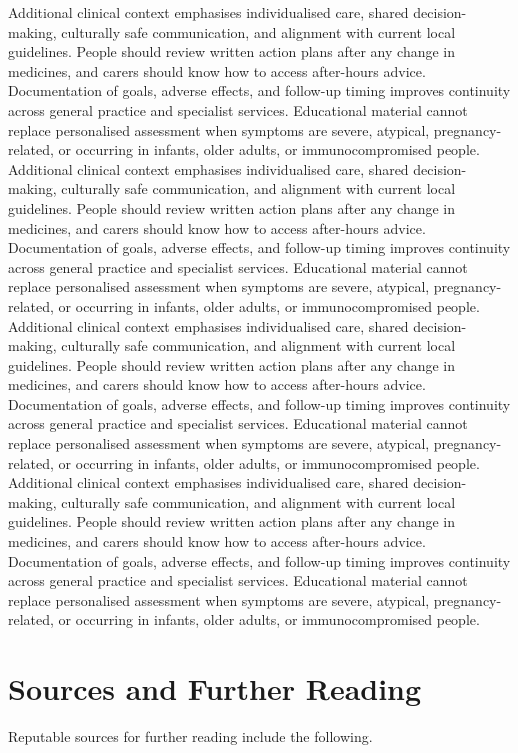 \begin{itemize}
\end{itemize} Additional clinical context emphasises individualised care, shared decision-making, culturally safe communication, and alignment with current local guidelines. People should review written action plans after any change in medicines, and carers should know how to access after-hours advice. Documentation of goals, adverse effects, and follow-up timing improves continuity across general practice and specialist services. Educational material cannot replace personalised assessment when symptoms are severe, atypical, pregnancy-related, or occurring in infants, older adults, or immunocompromised people. Additional clinical context emphasises individualised care, shared decision-making, culturally safe communication, and alignment with current local guidelines. People should review written action plans after any change in medicines, and carers should know how to access after-hours advice. Documentation of goals, adverse effects, and follow-up timing improves continuity across general practice and specialist services. Educational material cannot replace personalised assessment when symptoms are severe, atypical, pregnancy-related, or occurring in infants, older adults, or immunocompromised people. Additional clinical context emphasises individualised care, shared decision-making, culturally safe communication, and alignment with current local guidelines. People should review written action plans after any change in medicines, and carers should know how to access after-hours advice. Documentation of goals, adverse effects, and follow-up timing improves continuity across general practice and specialist services. Educational material cannot replace personalised assessment when symptoms are severe, atypical, pregnancy-related, or occurring in infants, older adults, or immunocompromised people. Additional clinical context emphasises individualised care, shared decision-making, culturally safe communication, and alignment with current local guidelines. People should review written action plans after any change in medicines, and carers should know how to access after-hours advice. Documentation of goals, adverse effects, and follow-up timing improves continuity across general practice and specialist services. Educational material cannot replace personalised assessment when symptoms are severe, atypical, pregnancy-related, or occurring in infants, older adults, or immunocompromised people.

\section*{Sources and Further Reading}
Reputable sources for further reading include the following.


